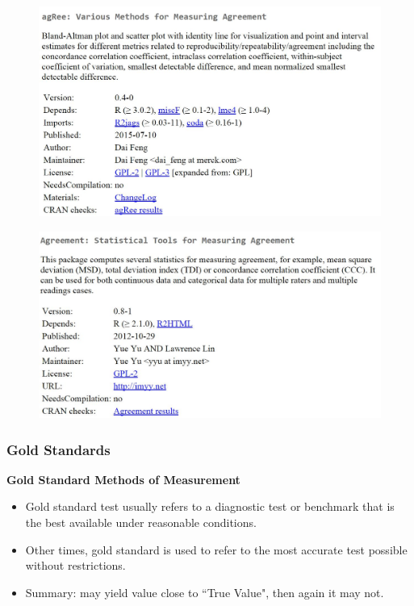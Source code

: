 \documentclass[compress]{beamer}        %
\begin{document}
\begin{frame}
	\begin{figure}
\centering
\includegraphics[width=1.05\linewidth]{images/CRAN-agRee}

\end{figure}

\end{frame}
\begin{frame}

	\begin{figure}
\centering
\includegraphics[width=1.05\linewidth]{images/CRAN-agreement}

\end{figure}

\end{frame}	
		\begin{frame}
			\frametitle{Gold Standards}
			\large
			\vspace{-1.3cm}
			\textbf{Gold Standard Methods of Measurement}
			\begin{itemize}
				\item	Gold standard test usually refers to a diagnostic test or benchmark that is the best available under reasonable conditions.
				
				
				\item	Other times, gold standard is used to refer to the most accurate test possible without restrictions.
				\item Summary: may yield value close to ``True Value", then again it may not.
			\end{itemize}
		\end{frame}
		
\end{document}
